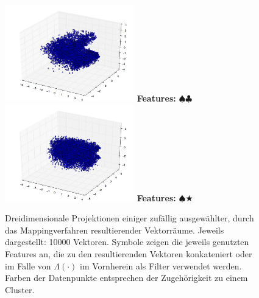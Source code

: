 \begin{itemize}
\begin{figure}[h]
\begin{multicols}{2}
    \columnbreak

    \includegraphics[width=0.5\textwidth]{../img/mappings_get10000_occ100.jpg}
    \textbf{Features:} $\spadesuit\clubsuit$
    \includegraphics[width=0.5\textwidth]{../img/mappings10000_occ.jpg}
    \textbf{Features:} $\spadesuit\bigstar$
  \end{multicols}

  \flushleft
  \caption[Dreidimensionale Projektionen einiger durch das Mappingverfahren resultierender Vektorräume]{Dreidimensionale
   Projektionen einiger zufällig ausgewählter, durch das Mappingverfahren resultierender Vektorräume.
   Jeweils dargestellt: 10000 Vektoren. Symbole zeigen die jeweils genutzten Features an, die zu den resultierenden
   Vektoren konkateniert oder im Falle von $\Lambda(\cdot)$ im Vornherein als Filter verwendet werden. Farben
   der Datenpunkte entsprechen der Zugehörigkeit zu einem Cluster.\label{fig:proj_map}}
\end{figure}

\end{itemize}

